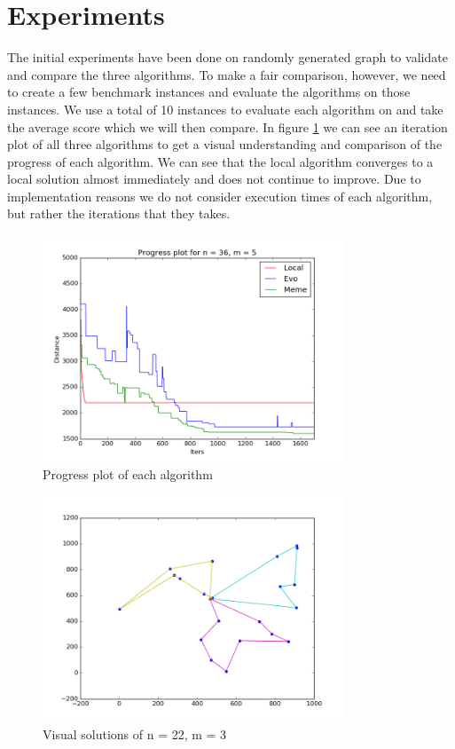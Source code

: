 \documentclass[journal]{IEEEtrancz}
\begin{document}
\section{Experiments}
The initial experiments have been done on randomly generated graph to validate and compare the three algorithms.
To make a fair comparison, however, we need to create a few benchmark instances and evaluate the algorithms on those instances. We use a total of 10 instances to evaluate each algorithm on and take the average score which we will then compare. In figure \ref{fig:progfig} we can see an iteration plot of all three algorithms to get 
a visual understanding and comparison of the progress of each algorithm. We can see that the local algorithm
converges to a local solution almost immediately and does not continue to improve. Due to implementation reasons we do not consider execution times of each algorithm, but rather the iterations that they takes. 


\begin{figure}[ht]
  \centering
    \includegraphics[width=9cm]{progplot}
      \caption{Progress plot of each algorithm}
    \label{fig:progfig}
\end{figure}

\begin{figure}[ht]
  \centering
    \includegraphics[width=9cm]{clean}
      \caption{Visual solutions of n = 22, m = 3}
    \label{fig:solfig}
\end{figure}
\end{document}
